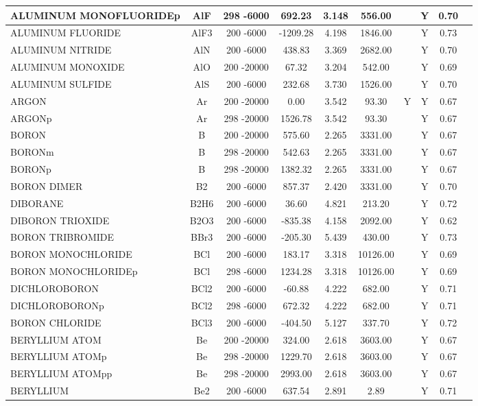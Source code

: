 \begin{longtable}{@{\extracolsep{\fill}}|l|c|c|c|c|c|c|c|c|l|}
ALUMINUM MONOFLUORIDEp&AlF&298 -6000&  692.23& 3.148&   556.00& &Y& 0.70&\\ \hline
ALUMINUM FLUORIDE&AlF3&200 -6000&-1209.28& 4.198&  1846.00& &Y& 0.73&\\ \hline
ALUMINUM NITRIDE&AlN&200 -6000&  438.83& 3.369&  2682.00& &Y& 0.70&\\ \hline
ALUMINUM MONOXIDE&AlO&200 -20000&   67.32& 3.204&   542.00& &Y& 0.69&\\ \hline
ALUMINUM SULFIDE&AlS&200 -6000&  232.68& 3.730&  1526.00& &Y& 0.70&\\ \hline
ARGON&Ar&200 -20000&    0.00& 3.542&    93.30&Y&Y& 0.67&\\ \hline
ARGONp&Ar&298 -20000& 1526.78& 3.542&    93.30& &Y& 0.67&\\ \hline
BORON&B&200 -20000&  575.60& 2.265&  3331.00& &Y& 0.67&\\ \hline
BORONm&B&298 -20000&  542.63& 2.265&  3331.00& &Y& 0.67&\\ \hline
BORONp&B&298 -20000& 1382.32& 2.265&  3331.00& &Y& 0.67&\\ \hline
BORON DIMER&B2&200 -6000&  857.37& 2.420&  3331.00& &Y& 0.70&\\ \hline
DIBORANE&B2H6&200 -6000&   36.60& 4.821&   213.20& &Y& 0.72&\\ \hline
DIBORON TRIOXIDE&B2O3&200 -6000& -835.38& 4.158&  2092.00& &Y& 0.62&\\ \hline
BORON TRIBROMIDE&BBr3&200 -6000& -205.30& 5.439&   430.00& &Y& 0.73&\\ \hline
BORON MONOCHLORIDE&BCl&200 -6000&  183.17& 3.318& 10126.00& &Y& 0.69&\\ \hline
BORON MONOCHLORIDEp&BCl&298 -6000& 1234.28& 3.318& 10126.00& &Y& 0.69&\\ \hline
DICHLOROBORON&BCl2&200 -6000&  -60.88& 4.222&   682.00& &Y& 0.71&\\ \hline
DICHLOROBORONp&BCl2&298 -6000&  672.32& 4.222&   682.00& &Y& 0.71&\\ \hline
BORON CHLORIDE&BCl3&200 -6000& -404.50& 5.127&   337.70& &Y& 0.72&\\ \hline
BERYLLIUM ATOM&Be&200 -20000&  324.00& 2.618&  3603.00& &Y& 0.67&\\ \hline
BERYLLIUM ATOMp&Be&298 -20000& 1229.70& 2.618&  3603.00& &Y& 0.67&\\ \hline
BERYLLIUM ATOMpp&Be&298 -20000& 2993.00& 2.618&  3603.00& &Y& 0.67&\\ \hline
BERYLLIUM&Be2&200 -6000&  637.54& 2.891&     2.89& &Y& 0.71&\\ \hline

\end{longtable}
